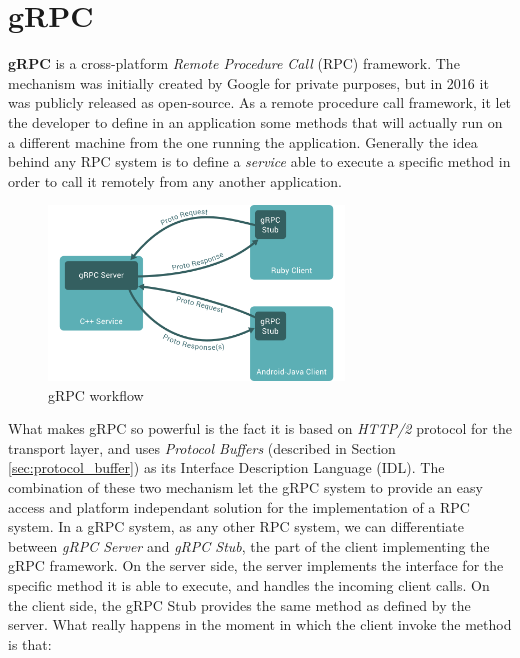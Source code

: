 	\section{gRPC}
		\par \textbf{gRPC} \cite{grpc} is a cross-platform \textit{Remote Procedure Call} (RPC) framework. The mechanism was initially created by Google for private purposes, but in 2016 it was publicly released as open-source. As a remote procedure call framework, it let the developer to define in an application some methods that will actually run on a different machine from the one running the application. Generally the idea behind any RPC system is to define a \textit{service} able to execute a specific method in order to call it remotely from any another application.
		\begin{figure}[ht]
			\centering
			\includegraphics[width=0.7\textwidth]{images/grpc.png}
			\caption{gRPC workflow \cite{grpc}}
		\end{figure}		
		\par What makes gRPC so powerful is the fact it is based on \textit{HTTP/2} protocol for the transport layer, and uses \textit{Protocol Buffers} (described in Section \ref{sec:protocol_buffer}) as its Interface Description Language (IDL). The combination of these two mechanism let the gRPC system to provide an easy access and platform independant solution for the implementation of a RPC system. \newline
		In a gRPC system, as any other RPC system, we can differentiate between \textit{gRPC Server} and \textit{gRPC Stub}, the part of the client implementing the gRPC framework. On the server side, the server implements the interface for the specific method it is able to execute, and handles the incoming client calls. On the client side, the gRPC Stub provides the same method as defined by the server. What really happens in the moment in which the client invoke the method is that:
